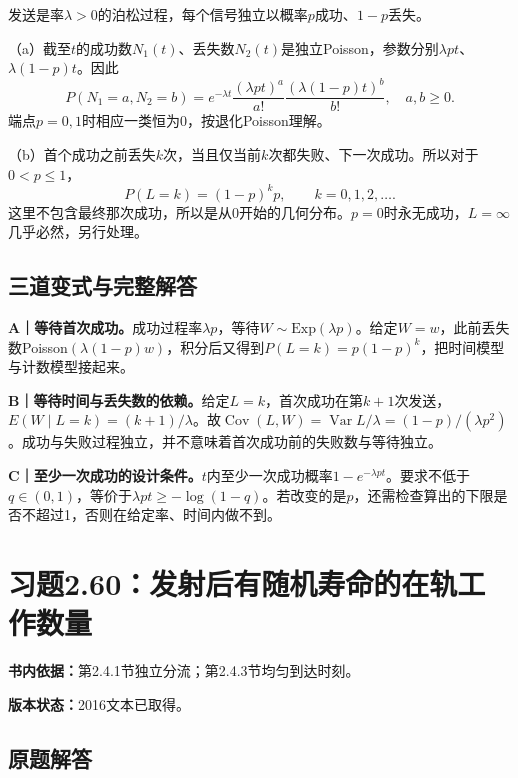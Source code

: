 \documentclass[
  11pt,
  a4paper,
  UTF8,fontset=fandol]{ctexart}
\let\OldSection\section
\renewcommand{\section}{\Needspace{7\baselineskip}\OldSection}
\let\OldSubsection\subsection
\renewcommand{\subsection}{\Needspace{5\baselineskip}\OldSubsection}
\begin{document}
发送是率\(\lambda>0\)的泊松过程，每个信号独立以概率\(p\)成功、\(1-p\)丢失。

（a）截至\(t\)的成功数\(N_1(t)\)、丢失数\(N_2(t)\)是独立Poisson，参数分别\(\lambda pt\)、\(\lambda(1-p)t\)。因此
\[\boxed{P(N_1=a,N_2=b)=e^{-\lambda t}\frac{(\lambda pt)^a}{a!}\frac{(\lambda(1-p)t)^b}{b!}},\quad a,b\ge0.\]
端点\(p=0,1\)时相应一类恒为0，按退化Poisson理解。

（b）首个成功之前丢失\(k\)次，当且仅当前\(k\)次都失败、下一次成功。所以对于\(0<p\le1\)，
\[\boxed{P(L=k)=(1-p)^kp,\qquad k=0,1,2,\ldots.}\]
这里不包含最终那次成功，所以是从0开始的几何分布。\(p=0\)时永无成功，\(L=\infty\)几乎必然，另行处理。

\subsection{三道变式与完整解答}\label{ux4e09ux9053ux53d8ux5f0fux4e0eux5b8cux6574ux89e3ux7b54-58}

\textbf{A｜等待首次成功。}成功过程率\(\lambda p\)，等待\(W\sim\mathrm{Exp}(\lambda p)\)。给定\(W=w\)，此前丢失数Poisson\((\lambda(1-p)w)\)，积分后又得到\(P(L=k)=p(1-p)^k\)，把时间模型与计数模型接起来。

\textbf{B｜等待时间与丢失数的依赖。}给定\(L=k\)，首次成功在第\(k+1\)次发送，\(E(W\mid L=k)=(k+1)/\lambda\)。故\(\operatorname{Cov}(L,W)=\operatorname{Var}L/\lambda=(1-p)/(\lambda p^2)\)。成功与失败过程独立，并不意味着首次成功前的失败数与等待独立。

\textbf{C｜至少一次成功的设计条件。}\(t\)内至少一次成功概率\(1-e^{-\lambda pt}\)。要求不低于\(q\in(0,1)\)，等价于\(\lambda pt\ge-\log(1-q)\)。若改变的是\(p\)，还需检查算出的下限是否不超过1，否则在给定率、时间内做不到。

\newpage

\section{习题2.60：发射后有随机寿命的在轨工作数量}\label{ux4e60ux98982.60ux53d1ux5c04ux540eux6709ux968fux673aux5bffux547dux7684ux5728ux8f68ux5de5ux4f5cux6570ux91cf}

\textbf{书内依据：}第2.4.1节独立分流；第2.4.3节均匀到达时刻。

\textbf{版本状态：}2016文本已取得。

\subsection{原题解答}\label{ux539fux9898ux89e3ux7b54-59}
\end{document}
